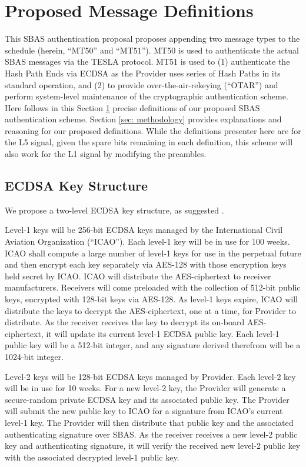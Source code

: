 \documentclass[letterpaper,times]{IONconf/IONconf}
\begin{document}
\section{Proposed Message Definitions} \label{sec: definitions}

This SBAS authentication proposal proposes appending two message types to the schedule (herein, ``MT50'' and ``MT51'').
MT50 is used to authenticate the actual SBAS messages via the TESLA protocol.
MT51 is used to (1) authenticate the Hash Path Ends via ECDSA as the Provider uses series of Hash Paths in its standard operation, and (2) to provide over-the-air-rekeying (``OTAR'') and perform system-level maintenance of the cryptographic authentication scheme.
Here follows in this Section \ref{sec: definitions} precise definitions of our proposed SBAS authentication scheme.
Section \ref{sec: methodology} provides explanations and reasoning for our proposed definitions.
While the definitions presenter here are for the L5 signal, given the spare bits remaining in each definition, this scheme will also work for the L1 signal by modifying the preambles.

\subsection{ECDSA Key Structure} \label{sec: ECDSA Key Structure}

We propose a two-level ECDSA key structure, as suggested \cite{Neish_Dissertation}.

Level-1 keys will be 256-bit ECDSA keys managed by the  International Civil Aviation Organization (``ICAO'').
Each level-1 key will be in use for 100 weeks.
ICAO shall compute a large number of level-1 keys for use in the perpetual future and then encrypt each key separately via AES-128 with those encryption keys held secret by ICAO.
ICAO will distribute the AES-ciphertext to receiver manufacturers.
Receivers will come preloaded with the collection of 512-bit public keys, encrypted with 128-bit keys via AES-128.
As level-1 keys expire, ICAO will distribute the keys to decrypt the AES-ciphertext, one at a time, for Provider to distribute.
As the receiver receives the key to decrypt its on-board AES-ciphertext, it will update its current level-1 ECDSA public key.
Each level-1 public key will be a 512-bit integer, and any signature derived therefrom will be a 1024-bit integer.

Level-2 keys will be 128-bit ECDSA keys managed by Provider.
Each level-2 key will be in use for 10 weeks.
For a new level-2 key, the Provider will generate a secure-random private ECDSA key and its associated public key.
The Provider will submit the new public key to ICAO for a signature from ICAO's current level-1 key.
The Provider will then distribute that public key and the associated authenticating signature over SBAS.
As the receiver receives a new level-2 public key and authenticating signature, it will verify the received new level-2 public key with the associated decrypted level-1 public key.
\end{document}
